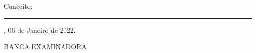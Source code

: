 \documentclass[
	12pt,				%
	openright,			%
	oneside,			%
	a4paper,			%
	english,			%
	brazil				%
	]{abntex2}
\begin{document}


%
% 
%
\begin{folhadeaprovacao}

  \begin{center}
    {\ABNTEXchapterfont\large\imprimirautor}

    \vspace*{\fill}\vspace*{\fill}
    \begin{center}
      \ABNTEXchapterfont\bfseries\Large\imprimirtitulo
    \end{center}
    \vspace*{\fill}
    
    \hspace{.45\textwidth}
    \begin{minipage}{.5\textwidth}
        \imprimirpreambulo
    \end{minipage}%
    \vspace*{\fill}
   \end{center}
        
   Conceito: \rule{3cm}{.1pt}
   
   \imprimirlocal, 06 de Janeiro de 2022.
   
   \vspace{1cm}
   \begin{center}
   BANCA EXAMINADORA
   \end{center}
    

      

  
\end{folhadeaprovacao}
\end{document}
